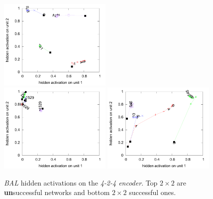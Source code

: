 \begin{figure}[H]
  \includegraphics[width=0.48\textwidth]{img/hid-bal-good-convex.pdf}  \\
  \includegraphics[width=0.48\textwidth]{img/hid-bal-good-step.pdf}  
  \includegraphics[width=0.48\textwidth]{img/hid-bal-good-stagnation.pdf}  \\ 
  \caption{\emph{BAL} hidden activations on the \emph{4-2-4 encoder}. Top $2\times2$ are {\bf un}successful networks and bottom $2\times2$ successful ones.}
  \label{fig:results-hidden-activations-bal}
\end{figure}

